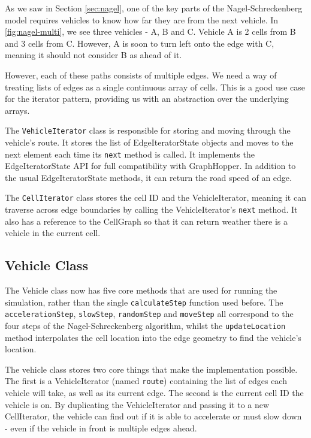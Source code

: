 \documentclass[ %
                    author={Alexander Hill},
                supervisor={Dr. Benjamin Sach},
                    degree={MEng},
                     title={MARMOSET},
                  subtitle={Multi-Agent Route Management using Online Simulation for Efficient Transportation},
                      type={research},
                      year={2016} ]{dissertation}
\begin{document}
As we saw in Section \ref{sec:nagel}, one of the key parts of the
Nagel-Schreckenberg model requires vehicles to know how far they are from the
next vehicle. In \ref{fig:nagel-multi}, we see three vehicles - A, B and C.
Vehicle A is 2 cells from B and 3 cells from C. However, A is soon to turn left
onto the edge with C, meaning it should not consider B as ahead of it.

However, each of these paths consists of multiple edges. We need a way of
treating lists of edges as a single continuous array of cells. This is a good
use case for the iterator pattern, providing us with an abstraction over the
underlying arrays.

The \texttt{VehicleIterator} class is responsible for storing and moving through
the vehicle's route. It stores the list of EdgeIteratorState objects and moves
to the next element each time its \texttt{next} method is called. It implements
the EdgeIteratorState API for full compatibility with GraphHopper. In addition
to the usual EdgeIteratorState methods, it can return the road speed of an edge.

The \texttt{CellIterator} class stores the cell ID and the VehicleIterator,
meaning it can traverse across edge boundaries by calling the VehicleIterator's
\texttt{next} method. It also has a reference to the CellGraph so that it can
return weather there is a vehicle in the current cell.


\subsection{Vehicle Class}

The Vehicle class now has five core methods that are used for running the
simulation, rather than the single \texttt{calculateStep} function used before.
The \texttt{accelerationStep}, \texttt{slowStep}, \texttt{randomStep} and
\texttt{moveStep} all correspond to the four steps of the Nagel-Schreckenberg
algorithm, whilst the \texttt{updateLocation} method interpolates the cell
location into the edge geometry to find the vehicle's location.

The vehicle class stores two core things that make the implementation possible.
The first is a VehicleIterator (named \texttt{route}) containing the list of
edges each vehicle will take, as well as its current edge. The second is the
current cell ID the vehicle is on. By duplicating the VehicleIterator and
passing it to a new CellIterator, the vehicle can find out if it is able to
accelerate or must slow down - even if the vehicle in front is multiple edges
ahead.
\end{document}
